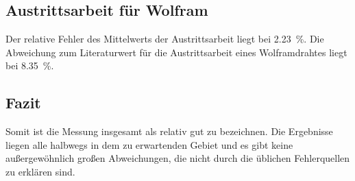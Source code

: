 \subsection{Austrittsarbeit für Wolfram}
Der relative Fehler des Mittelwerts der Austrittsarbeit liegt bei \SI{2.23}{\percent}. Die Abweichung zum Literaturwert 
für die Austrittsarbeit eines Wolframdrahtes liegt bei \SI{8.35}{\percent}. 

\subsection{Fazit}
Somit ist die Messung insgesamt als relativ gut zu bezeichnen. Die Ergebnisse liegen alle halbwegs in dem zu 
erwartenden Gebiet und es gibt keine außergewöhnlich großen Abweichungen, die nicht durch die üblichen Fehlerquellen 
zu erklären sind. %